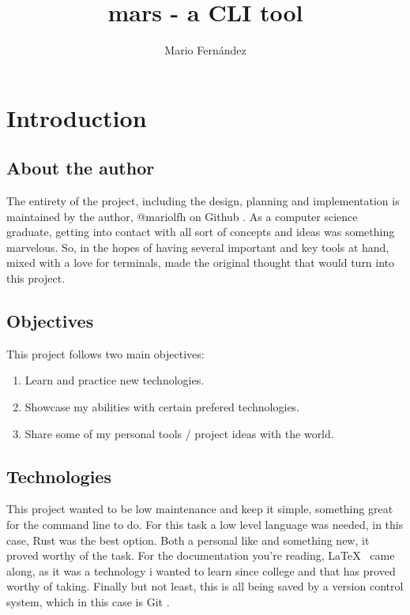 \documentclass{report}
\title{mars - a CLI tool}
\author{Mario Fernández}
\begin{document}
\maketitle

\tableofcontents

\chapter{Introduction}
\section{About the author}
The entirety of the project, including the design, planning and implementation is maintained by the author, @mariolfh on Github \cite{githubinc.MariolfhOverview2025}. As a computer science graduate, getting into contact with all sort of concepts and ideas was something marvelous. So, in the hopes of having several important and key tools at hand, mixed with a love for terminals, made the original thought that would turn into this project. 

\section{Objectives}
This project follows two main objectives:
\begin{enumerate}
\item{Learn and practice new technologies.}
\item{Showcase my abilities with certain prefered technologies.}
\item{Share some of my personal tools / project ideas with the world.}
\end{enumerate}

\section{Technologies}
This project wanted to be low maintenance and keep it simple, something great for the command line to do. For this task a low level language was needed, in this case, Rust \cite{RustProgrammingLanguage} was the best option. Both a personal like and something new, it proved worthy of the task. For the documentation you're reading, \LaTeX\ \cite{LaTeXDocumentPreparation} came along, as it was a technology i wanted to learn since college and that  has proved worthy of taking. Finally but not least, this is all being saved by a version control system, which in this case is Git \cite{Git}.
\end{document}
